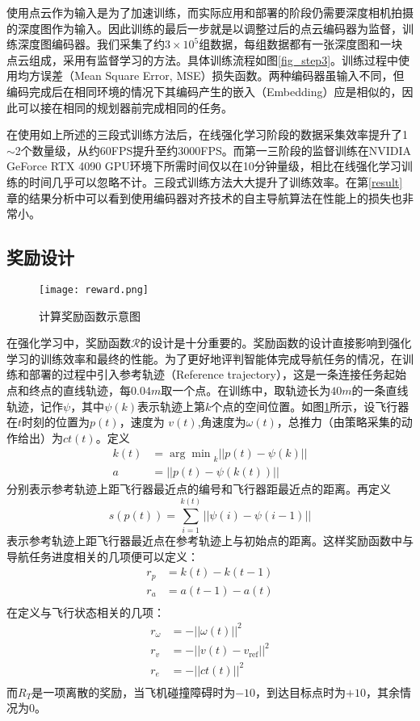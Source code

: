 使用点云作为输入是为了加速训练，而实际应用和部署的阶段仍需要深度相机拍摄的深度图作为输入。因此训练的最后一步就是以调整过后的点云编码器为监督，训练深度图编码器。我们采集了约$3\times 10^5$组数据，每组数据都有一张深度图和一块点云组成，采用有监督学习的方法。具体训练流程如图\ref{fig_step3}。训练过程中使用均方误差（Mean Square Error, MSE）损失函数。两种编码器虽输入不同，但编码完成后在相同环境的情况下其编码产生的嵌入（Embedding）应是相似的，因此可以接在相同的规划器前完成相同的任务。

在使用如上所述的三段式训练方法后，在线强化学习阶段的数据采集效率提升了1$\sim$2个数量级，从约60FPS提升至约3000FPS。而第一三阶段的监督训练在NVIDIA GeForce RTX 4090 GPU环境下所需时间仅以在10分钟量级，相比在线强化学习训练的时间几乎可以忽略不计。三段式训练方法大大提升了训练效率。在第\ref{result}章的结果分析中可以看到使用编码器对齐技术的自主导航算法在性能上的损失也非常小。

\subsection{奖励设计}
\label{reward_design}
\begin{figure}
  \centering
  \texttt{[image: reward.png]}
  \caption{计算奖励函数示意图}
  \label{fig_reward}
\end{figure}
在强化学习中，奖励函数$\mathcal{R}$的设计是十分重要的。奖励函数的设计直接影响到强化学习的训练效率和最终的性能。为了更好地评判智能体完成导航任务的情况，在训练和部署的过程中引入参考轨迹（Reference trajectory），这是一条连接任务起始点和终点的直线轨迹，每$0.04m$取一个点。在训练中，取轨迹长为$40m$的一条直线轨迹，记作$\psi$，其中$\psi(k)$表示轨迹上第$k$个点的空间位置。如图\ref{fig_reward}所示，设飞行器在$t$时刻的位置为$p(t)$，速度为 $v(t)$,角速度为$\omega(t)$，总推力（由策略采集的动作给出）为$ct(t)$。定义
\[\begin{aligned}
  k(t) &= {\arg\min}_k {||p(t)-\psi(k)||}\\
  a &= ||p(t)-\psi(k(t))||
\end{aligned}\]
分别表示参考轨迹上距飞行器最近点的编号和飞行器距最近点的距离。再定义
\[
  s(p(t)) = \sum_{i=1}^{k(t)} ||\psi(i)-\psi(i-1)||
\]
表示参考轨迹上距飞行器最近点在参考轨迹上与初始点的距离。这样奖励函数中与导航任务进度相关的几项便可以定义：
\[\begin{aligned}
  r_p &= k(t)-k(t-1)\\
  r_a &= a(t-1)-a(t)\\
\end{aligned}\]
在定义与飞行状态相关的几项：
\[\begin{aligned}
  r_\omega &= -||\omega(t)||^2\\
  r_v &= -||v(t)-v_\text{ref}||^2\\
  r_e & = -||ct(t)||^2\\
\end{aligned}\]
而$R_T$是一项离散的奖励，当飞机碰撞障碍时为$-10$，到达目标点时为$+10$，其余情况为$0$。

